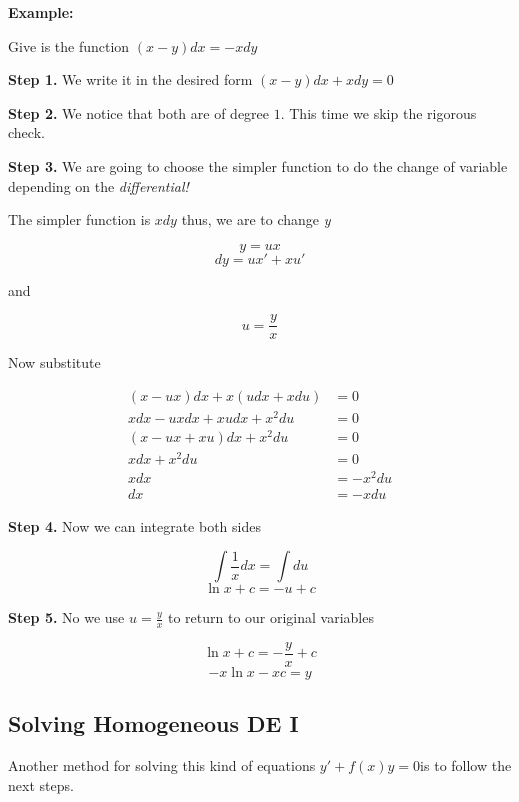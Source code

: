 \textbf{Example:}
\vspace{\baselineskip}


Give is the function \((x -y)dx = - xdy\)
\vspace{\baselineskip}

\textbf{Step 1.} We write it in the desired form \((x - y)dx + xdy = 0\)
\vspace{\baselineskip}

\textbf{Step 2.} We notice that both are of degree \(1\). This time we skip the rigorous check.
\vspace{\baselineskip}

\textbf{Step 3.} We are going to choose the simpler function to do the change of variable 
depending on the \emph{differential!} 
\vspace{\baselineskip}

The simpler function is \(xdy\) thus, we are to change \emph{y}

\[
    y = ux
\]
\[
    dy = ux' + xu'
\]

and 

\[
    u = \frac{y}{x}
\]

Now substitute

\begin{align*}
    (x - ux)dx + x(udx + xdu) &= 0\\
    xdx - u x dx + x u dx + x^{2}du &= 0\\
    (x - ux + xu)dx + x^{2}du &= 0\\
    xdx + x^{2}du &= 0\\
    xdx &= - x^{2}du\\
    dx &= - xdu
\end{align*}

\textbf{Step 4.} Now we can integrate both sides

\[
    \int \frac{1}{x}dx = \int du
\]
\[
    \ln x + c = -u + c
\]

\textbf{Step 5.} No we use \(u = \frac{y}{x}\) to return to our original variables

\[
    \ln x + c = -\frac{y}{x} + c
\]
\[
    -x\ln x - xc = y
\]

\subsection{Solving Homogeneous DE I}

Another method for solving this kind of equations \(y' + f(x)y = 0\)is to follow the next steps.
\vspace{\baselineskip}

